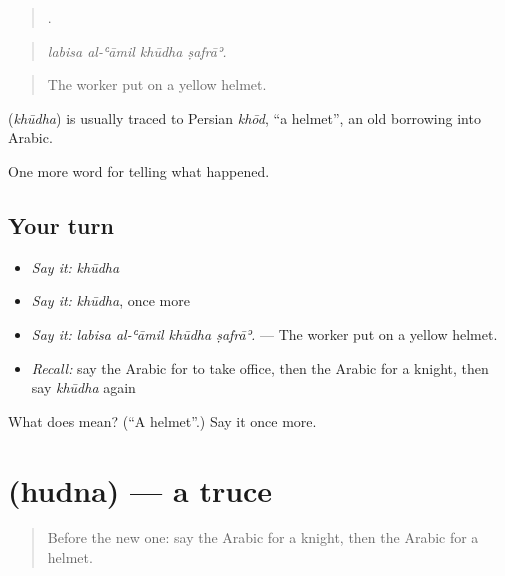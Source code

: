\begin{quote}
   .
\end{quote}

\begin{quote}
\emph{labisa al-ʿāmil khūdha ṣafrāʾ.}
\end{quote}

\begin{quote}
The worker put on a yellow helmet.
\end{quote}

\begin{cousinweb}
\textbf{} (\emph{khūdha}) is usually traced to Persian \emph{khōd}, \textquotedblleft{}a helmet\textquotedblright{}, an old borrowing into Arabic.
\end{cousinweb}

\begin{grammarlens}[title={What you've built}]
One more word for telling what happened.
\end{grammarlens}

\subsection*{Your turn}
\begin{itemize}
\raggedright
  \item \emph{Say it:} \emph{khūdha}
  \item \emph{Say it:} \emph{khūdha}, once more
  \item \emph{Say it:} \emph{labisa al-ʿāmil khūdha ṣafrāʾ.} — The worker put on a yellow helmet.
  \item \emph{Recall:} say the Arabic for to take office, then the Arabic for a knight, then say \emph{khūdha} again
\end{itemize}

\begin{tcolorbox}[breakable,colback=teal!4,colframe=teal!35!black,title={Before you move on}]
What does  mean? (\textquotedblleft{}A helmet\textquotedblright{}.) Say it once more.
\end{tcolorbox}
\section[\texorpdfstring{\ar{هدنة} (hudna)}{هدنة (hudna)}]{ (hudna) — a truce}

\label{lesson:AR-C341-hudna}



\begin{quote}
Before the new one: say the Arabic for a knight, then the Arabic for a helmet.
\end{quote}

